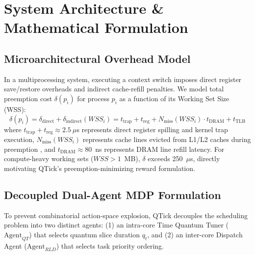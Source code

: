 \documentclass[journal]{IEEEtran}
\begin{document}
\section{System Architecture \& Mathematical Formulation}

\subsection{Microarchitectural Overhead Model}
In a multiprocessing system, executing a context switch imposes direct register save/restore overheads and indirect cache-refill penalties. We model total preemption cost $\delta(p_i)$ for process $p_i$ as a function of its Working Set Size (WSS):
\begin{equation}
\delta(p_i) = \delta_{\text{direct}} + \delta_{\text{indirect}}(WSS_i) = t_{\text{trap}} + t_{\text{reg}} + N_{\text{miss}}(WSS_i) \cdot t_{\text{DRAM}} + t_{\text{TLB}}
\label{eq:delta}
\end{equation}
where $t_{\text{trap}} + t_{\text{reg}} \approx 2.5~\mu$s represents direct register spilling and kernel trap execution, $N_{\text{miss}}(WSS_i)$ represents cache lines evicted from L1/L2 caches during preemption \cite{hunter2024quantifying}, and $t_{\text{DRAM}} \approx 80$~ns represents DRAM line refill latency. For compute-heavy working sets ($WSS > 1$~MB), $\delta$ exceeds 250~$\mu$s, directly motivating QTick's preemption-minimizing reward formulation.

\subsection{Decoupled Dual-Agent MDP Formulation}
To prevent combinatorial action-space explosion, QTick decouples the scheduling problem into two distinct agents: (1) an intra-core Time Quantum Tuner ($\text{Agent}_{QT}$) that selects quantum slice duration $q_t$, and (2) an inter-core Dispatch Agent ($\text{Agent}_{RLD}$) that selects task priority ordering.
\end{document}
